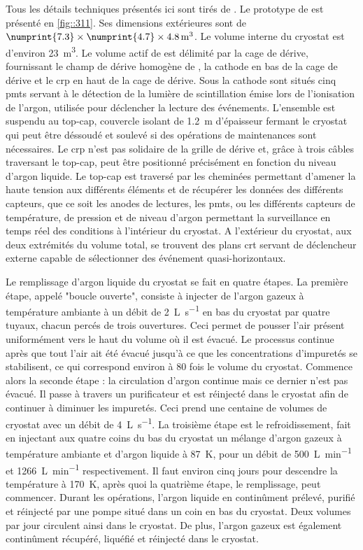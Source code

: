       Tous les détails techniques présentés ici sont tirés de \cite{Aimard2018}. Le prototype de \TOO{} est présenté en \autoref{fig::311}. Ses dimensions extérieures sont de $\numprint{7.3}\times\numprint{4.7}\times\SI{4.8}{\meter\cubed}$. Le volume interne du cryostat est d'environ \SI{23}{\meter\cubed}. Le volume actif de \TOO{} est délimité par la cage de dérive, fournissant le champ de dérive homogène de \driftfield{}, la cathode en bas de la cage de dérive et le \gls{crp} en haut de la cage de dérive. Sous la cathode sont situés cinq \glspl{pmt} servant à le détection de la lumière de scintillation émise lors de l'ionisation de l'argon, utilisée pour déclencher la lecture des événements. L'ensemble est suspendu au top-cap, couvercle isolant de \SI{1.2}{\meter} d'épaisseur fermant le cryostat qui peut être déssoudé et soulevé si des opérations de maintenances sont nécessaires. Le \gls{crp} n'est pas solidaire de la grille de dérive et, grâce à trois câbles traversant le top-cap, peut être positionné précisément en fonction du niveau d'argon liquide. Le top-cap est traversé par les cheminées permettant d'amener la haute tension aux différents éléments et de récupérer les données des différents capteurs, que ce soit les anodes de lectures, les \glspl{pmt}, ou les différents capteurs de température, de pression et de niveau d'argon permettant la surveillance en temps réel des conditions à l'intérieur du cryostat. A l'extérieur du cryostat, aux deux extrémités du volume total, se trouvent des plans \gls{crt} servant de déclencheur externe capable de sélectionner des événement quasi-horizontaux.

     Le remplissage d'argon liquide du cryostat se fait en quatre étapes. La première étape, appelé "boucle ouverte", consiste à injecter de l'argon gazeux à température ambiante à un débit de \SI{2}{\liter\per\second} en bas du cryostat par quatre tuyaux, chacun percés de trois ouvertures. Ceci permet de pousser l'air présent uniformément vers le haut du volume où il est évacué. Le processus continue après que tout l'air ait été évacué jusqu'à ce que les concentrations d'impuretés se stabilisent, ce qui correspond environ à 80 fois le volume du cryostat. Commence alors la seconde étape : la circulation d'argon continue mais ce dernier n'est pas évacué. Il passe à travers un purificateur et est réinjecté dans le cryostat afin de continuer à diminuer les impuretés. Ceci prend une centaine de volumes de cryostat avec un débit de \SI{4}{\liter\per\second}. La troisième étape est le refroidissement, fait en injectant aux quatre coins du bas du cryostat un mélange d'argon gazeux à température ambiante et d'argon liquide à \SI{87}{\kelvin}, pour un débit de \SI{500}{\liter\per\minute} et \SI{1266}{\liter\per\minute} respectivement. Il faut environ cinq jours pour descendre la température à \SI{170}{\kelvin}, après quoi la quatrième étape, le remplissage, peut commencer. Durant les opérations, l'argon liquide en continûment prélevé, purifié et réinjecté par une pompe situé dans un coin en bas du cryostat. Deux volumes par jour circulent ainsi dans le cryostat. De plus, l'argon gazeux est également continûment récupéré, liquéfié et réinjecté dans le cryostat. 

